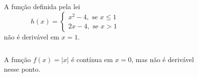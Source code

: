 \begin{frame}
  \begin{columns}[onlytextwidth]
    \begin{column}{0.49\textwidth}\vspace{-0.5cm}
      \begin{example}
        A função definida pela lei
        \begin{equation*}
          h(x) = \begin{cases}
            x^{2} - 4,\mbox{ se } x\leq 1\\ 2x - 4,\mbox{ se } x > 1
          \end{cases}
        \end{equation*}
        não é derivável em $x=1$.
      \end{example}
    \end{column}
    \begin{column}{0.5\textwidth}\vspace{-0.5cm}
      \begin{figure}
      \end{figure}
    \end{column}
  \end{columns}
\end{frame}

\begin{frame}
  \begin{columns}[onlytextwidth]
    \begin{column}{0.49\textwidth}\vspace{-0.5cm}
      \begin{example}
        A função $f(x) = |x|$ é contínua em $x = 0$, mas não é derivável nesse ponto.
      \end{example}
    \end{column}
    \begin{column}{0.5\textwidth}\vspace*{-0.5cm}
      \begin{figure}
      \end{figure}
    \end{column}
  \end{columns}
\end{frame}

